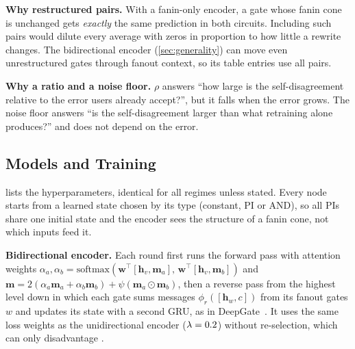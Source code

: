 \noindent\textbf{Why restructured pairs.} With a fanin-only encoder, a gate whose fanin cone is unchanged gets
\emph{exactly} the same prediction in both circuits. Including such pairs would dilute every average with zeros
in proportion to how little a rewrite changes. The bidirectional encoder (\cref{sec:generality}) can move even
unrestructured gates through fanout context, so its table entries use all pairs.

\noindent\textbf{Why a ratio and a noise floor.} $\rho$ answers ``how large is the self-disagreement relative to
the error users already accept?'', but it falls when the error grows. The noise floor answers ``is the
self-disagreement larger than what retraining alone produces?'' and does not depend on the error.

\FloatBarrier
\subsection{Models and Training}\label{app:models}

\noindent{} lists the hyperparameters, identical for all regimes unless stated. Every node starts from a learned state chosen by its type (constant, PI or AND), so all PIs share one initial state and the encoder sees the structure of a fanin cone, not which inputs feed it.

\noindent\textbf{Bidirectional encoder.} Each round first runs the forward pass with attention weights
$\alpha_a,\alpha_b=\mathrm{softmax}(\mathbf w^\top[\mathbf h_v,\mathbf m_a],\,\mathbf w^\top[\mathbf h_v,\mathbf m_b])$
and $\mathbf m=2(\alpha_a\mathbf m_a+\alpha_b\mathbf m_b)+\psi(\mathbf m_a\odot\mathbf m_b)$, then a reverse pass from
the highest level down in which each gate sums messages $\phi_r([\mathbf h_w,c])$ from its fanout gates $w$ and
updates its state with a second GRU, as in DeepGate~\cite{DBLP:conf/dac/0019KSWY022}. It uses the same loss weights as the
unidirectional encoder ($\lambda=0.2$) without re-selection, which can only disadvantage \ours.

